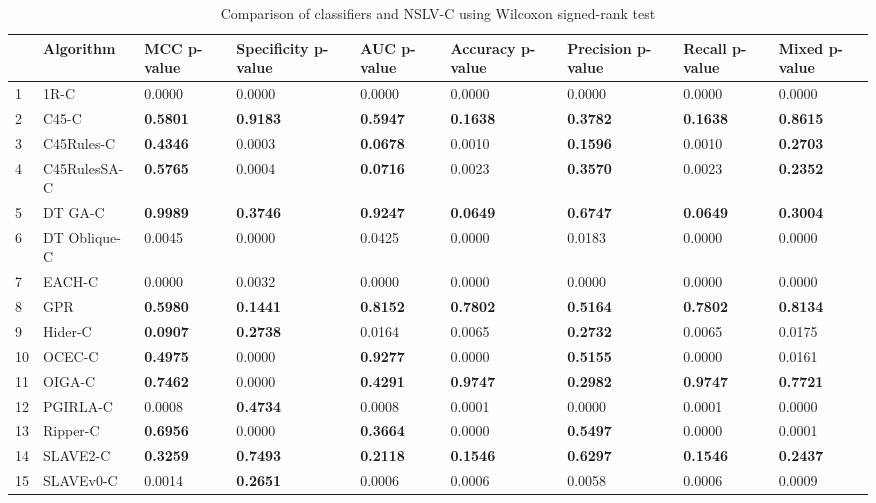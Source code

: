 \begin{table}
\footnotesize
\caption{Comparison of classifiers and NSLV-C using Wilcoxon signed-rank test}
\label{tab:wilcoxon comparison}
\begin{tabular}{lllllllll}
\hline
 & Algorithm & MCC p-value & Specificity p-value & AUC p-value & Accuracy p-value & Precision p-value & Recall p-value & Mixed p-value \\
\hline
1 & 1R-C & 0.0000 & 0.0000 & 0.0000 & 0.0000 & 0.0000 & 0.0000 & 0.0000 \\
2 & C45-C & \textbf{0.5801} & \textbf{0.9183} & \textbf{0.5947} & \textbf{0.1638} & \textbf{0.3782} & \textbf{0.1638} & \textbf{0.8615} \\
3 & C45Rules-C & \textbf{0.4346} & 0.0003 & \textbf{0.0678} & 0.0010 & \textbf{0.1596} & 0.0010 & \textbf{0.2703} \\
4 & C45RulesSA-C & \textbf{0.5765} & 0.0004 & \textbf{0.0716} & 0.0023 & \textbf{0.3570} & 0.0023 & \textbf{0.2352} \\
5 & DT GA-C & \textbf{0.9989} & \textbf{0.3746} & \textbf{0.9247} & \textbf{0.0649} & \textbf{0.6747} & \textbf{0.0649} & \textbf{0.3004} \\
6 & DT Oblique-C & 0.0045 & 0.0000 & 0.0425 & 0.0000 & 0.0183 & 0.0000 & 0.0000 \\
7 & EACH-C & 0.0000 & 0.0032 & 0.0000 & 0.0000 & 0.0000 & 0.0000 & 0.0000 \\
8 & GPR & \textbf{0.5980} & \textbf{0.1441} & \textbf{0.8152} & \textbf{0.7802} & \textbf{0.5164} & \textbf{0.7802} & \textbf{0.8134} \\
9 & Hider-C & \textbf{0.0907} & \textbf{0.2738} & 0.0164 & 0.0065 & \textbf{0.2732} & 0.0065 & 0.0175 \\
10 & OCEC-C & \textbf{0.4975} & 0.0000 & \textbf{0.9277} & 0.0000 & \textbf{0.5155} & 0.0000 & 0.0161 \\
11 & OIGA-C & \textbf{0.7462} & 0.0000 & \textbf{0.4291} & \textbf{0.9747} & \textbf{0.2982} & \textbf{0.9747} & \textbf{0.7721} \\
12 & PGIRLA-C & 0.0008 & \textbf{0.4734} & 0.0008 & 0.0001 & 0.0000 & 0.0001 & 0.0000 \\
13 & Ripper-C & \textbf{0.6956} & 0.0000 & \textbf{0.3664} & 0.0000 & \textbf{0.5497} & 0.0000 & 0.0001 \\
14 & SLAVE2-C & \textbf{0.3259} & \textbf{0.7493} & \textbf{0.2118} & \textbf{0.1546} & \textbf{0.6297} & \textbf{0.1546} & \textbf{0.2437} \\
15 & SLAVEv0-C & 0.0014 & \textbf{0.2651} & 0.0006 & 0.0006 & 0.0058 & 0.0006 & 0.0009 \\
\hline
\end{tabular}
\end{table}
